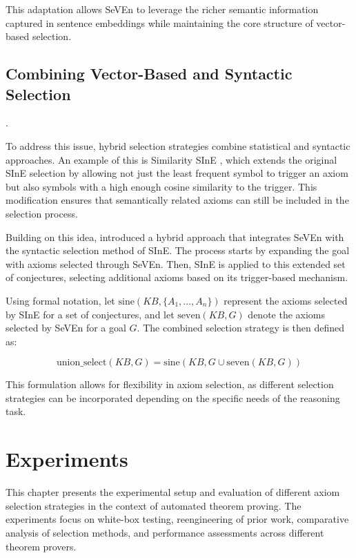 \documentclass[english,version-2020-11]{uzl-thesis}
\begin{document}
This adaptation allows SeVEn to leverage the richer semantic information captured in sentence embeddings while maintaining the core structure of vector-based selection.


\section{Combining Vector-Based and Syntactic Selection}.

To address this issue, hybrid selection strategies combine statistical and syntactic approaches. An example of this is Similarity SInE \cite{Furbach2019WordEmbeddings}, which extends the original SInE selection by allowing not just the least frequent symbol to trigger an axiom but also symbols with a high enough cosine similarity to the trigger. This modification ensures that semantically related axioms can still be included in the selection process.

Building on this idea, \cite{Schon2023} introduced a hybrid approach that integrates SeVEn with the syntactic selection method of SInE. The process starts by expanding the goal with axioms selected through SeVEn. Then, SInE is applied to this extended set of conjectures, selecting additional axioms based on its trigger-based mechanism. 

Using formal notation, let \( \text{sine}(KB, \{A_1, ..., A_n\}) \) represent the axioms selected by SInE for a set of conjectures, and let \( \text{seven}(KB, G) \) denote the axioms selected by SeVEn for a goal \( G \). The combined selection strategy is then defined as:

\begin{equation}
    \text{union\_select}(KB, G) = \text{sine}(KB, G \cup \text{seven}(KB, G))
\end{equation}

This formulation allows for flexibility in axiom selection, as different selection strategies can be incorporated depending on the specific needs of the reasoning task.


\clearpage

\chapter{Experiments}
\label{chapter-experiments}

This chapter presents the experimental setup and evaluation of different axiom selection strategies in the context of automated theorem proving. The experiments focus on white-box testing, reengineering of prior work, comparative analysis of selection methods, and performance assessments across different theorem provers.
\end{document}
